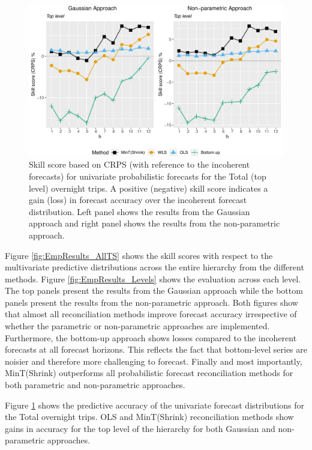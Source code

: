 \documentclass[12pt]{article}
\theoremstyle{definition}
\begin{document}
\begin{figure}
	\centering
	\small
	\includegraphics[width= \textwidth]{Empirical-results/UniVScore_TopLevel_ARIMA.pdf}
	\caption{Skill score based on CRPS (with reference to the incoherent forecasts) for univariate probabilistic forecasts for the Total (top level) overnight trips. A positive (negative) skill score indicates a gain (loss) in forecast accuracy over the incoherent forecast distribution. Left panel shows the results from the Gaussian approach and right panel shows the results from the non-parametric approach. }\label{fig:EmpResults_TopLevel}
\end{figure}

Figure \ref{fig:EmpResults_AllTS} shows the skill scores with respect to the multivariate predictive distributions across the entire hierarchy from the different methods. Figure \ref{fig:EmpResults_Levels} shows the evaluation across each level. The top panels present the results from the Gaussian approach while the bottom panels present the results from the non-parametric approach. Both figures show that almost all reconciliation methods improve forecast accuracy irrespective of whether the parametric or non-parametric approaches are implemented. Furthermore, the bottom-up approach shows losses compared to the incoherent forecasts at all forecast horizons. This reflects the fact that bottom-level series are noisier and therefore more challenging to forecast. Finally and most importantly, MinT(Shrink) outperforms all probabilistic forecast reconciliation methods for both parametric and non-parametric approaches.

Figure \ref{fig:EmpResults_TopLevel} shows the predictive accuracy of the univariate forecast distributions for the Total overnight trips. OLS and MinT(Shrink) reconciliation methods show gains in accuracy for the top level of the hierarchy for both Gaussian and non-parametric approaches.
\end{document}
